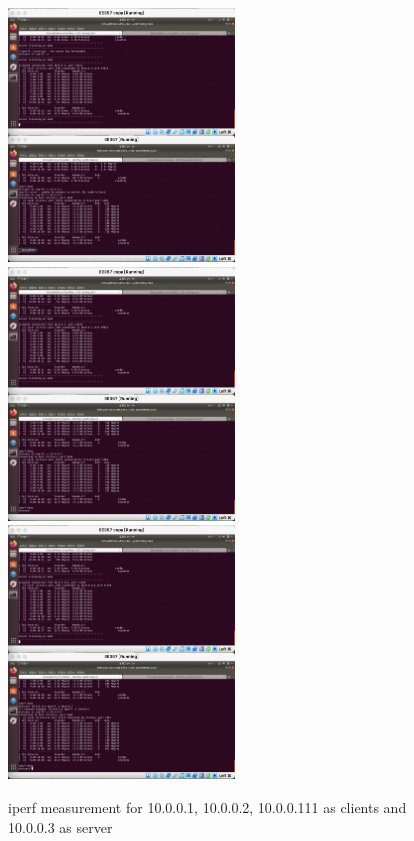 \begin{exercise}[]
\begin{solution}
  \begin{figure}[ht]
    \begin{center}
    \includegraphics[width=6cm]{img/lab4/ex-2-2-4-1.png}
    \includegraphics[width=6cm]{img/lab4/ex-2-2-4-2.png}
    \includegraphics[width=6cm]{img/lab4/ex-2-2-4-3.png}
    \caption{iperf measurement for 10.0.0.1, 10.0.0.2, 10.0.0.111 as clients and 10.0.0.3 as server}
    \label{fig:ex2-2-4}
    \end{center}
  \end{figure}
  \end{solution}
  \label{ex2}
\end{exercise}

